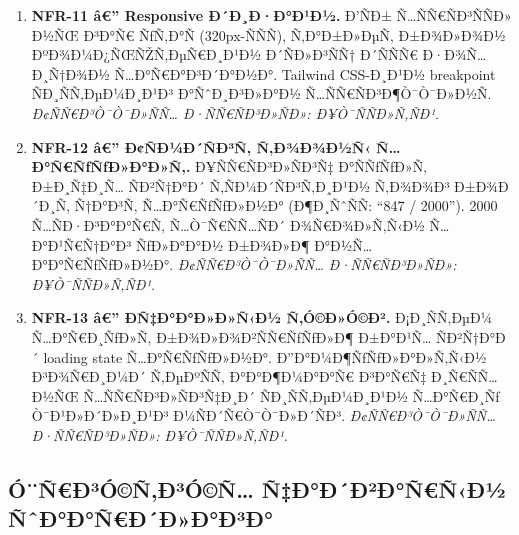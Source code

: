 \documentclass[12pt,A4]{report}
\begin{document}
\begin{enumerate}

  \item \textbf{NFR-11 â€” Responsive Ð´Ð¸Ð·Ð°Ð¹Ð½.}
        Ð’ÑÐ± Ñ…ÑÑ€ÑÐ³ÑÑÐ» Ð½ÑŒ Ð³Ð°Ñ€ ÑƒÑ‚Ð°Ñ (320px-ÑÑÑ), Ñ‚Ð°Ð±Ð»ÐµÑ‚
        Ð±Ð¾Ð»Ð¾Ð½ ÐºÐ¾Ð¼Ð¿ÑŒÑŽÑ‚ÐµÑ€Ð¸Ð¹Ð½ Ð´ÑÐ»Ð³ÑÑ† Ð´ÑÑÑ€ Ð·Ð¾Ñ…Ð¸Ñ†Ð¾Ð½ Ñ…Ð°Ñ€Ð°Ð³Ð´Ð°Ð½Ð°.
        Tailwind CSS-Ð¸Ð¹Ð½ breakpoint ÑÐ¸ÑÑ‚ÐµÐ¼Ð¸Ð¹Ð³ Ð°ÑˆÐ¸Ð³Ð»Ð°Ð½
        Ñ…ÑÑ€ÑÐ³Ð¶Ò¯Ò¯Ð»Ð½Ñ.
        \textit{Ð¢ÑÑ€Ð³Ò¯Ò¯Ð»ÑÑ… Ð·ÑÑ€ÑÐ³Ð»ÑÐ»: Ð¥Ò¯ÑÑÐ»Ñ‚ÑÐ¹.}

  \item \textbf{NFR-12 â€” Ð¢ÑÐ¼Ð´ÑÐ³Ñ‚ Ñ‚Ð¾Ð¾Ð½Ñ‹ Ñ…Ð°Ñ€ÑƒÑƒÐ»Ð°Ð»Ñ‚.}
        Ð¥ÑÑ€ÑÐ³Ð»ÑÐ³Ñ‡ Ð°ÑÑƒÑƒÐ»Ñ‚ Ð±Ð¸Ñ‡Ð¸Ñ… ÑÐ²Ñ†Ð°Ð´ Ñ‚ÑÐ¼Ð´ÑÐ³Ñ‚Ð¸Ð¹Ð½ Ñ‚Ð¾Ð¾Ð³
        Ð±Ð¾Ð´Ð¸Ñ‚ Ñ†Ð°Ð³Ñ‚ Ñ…Ð°Ñ€ÑƒÑƒÐ»Ð½Ð° (Ð¶Ð¸ÑˆÑÑ: ``847 / 2000'').
        2000 Ñ…ÑÐ·Ð³Ð°Ð°Ñ€Ñ‚ Ñ…Ò¯Ñ€ÑÑ…ÑÐ´ Ð¾Ñ€Ð¾Ð»Ñ‚Ñ‹Ð½ Ñ…Ð°Ð¹Ñ€Ñ†Ð°Ð³ ÑƒÐ»Ð°Ð°Ð½
        Ð±Ð¾Ð»Ð¶ Ð°Ð½Ñ…Ð°Ð°Ñ€ÑƒÑƒÐ»Ð½Ð°.
        \textit{Ð¢ÑÑ€Ð³Ò¯Ò¯Ð»ÑÑ… Ð·ÑÑ€ÑÐ³Ð»ÑÐ»: Ð¥Ò¯ÑÑÐ»Ñ‚ÑÐ¹.}

  \item \textbf{NFR-13 â€” ÐÑ‡Ð°Ð°Ð»Ð»Ñ‹Ð½ Ñ‚Ó©Ð»Ó©Ð².}
        Ð¡Ð¸ÑÑ‚ÐµÐ¼ Ñ…Ð°Ñ€Ð¸ÑƒÐ»Ñ‚ Ð±Ð¾Ð»Ð¾Ð²ÑÑ€ÑƒÑƒÐ»Ð¶ Ð±Ð°Ð¹Ñ… ÑÐ²Ñ†Ð°Ð´ loading
        state Ñ…Ð°Ñ€ÑƒÑƒÐ»Ð½Ð°. Ð”Ð°Ð¼Ð¶ÑƒÑƒÐ»Ð°Ð»Ñ‚Ñ‹Ð½ Ð³Ð¾Ñ€Ð¸Ð¼Ð´ Ñ‚ÐµÐºÑÑ‚
        Ð°Ð°Ð¶Ð¼Ð°Ð°Ñ€ Ð³Ð°Ñ€Ñ‡ Ð¸Ñ€ÑÑ… Ð½ÑŒ Ñ…ÑÑ€ÑÐ³Ð»ÑÐ³Ñ‡Ð¸Ð´ ÑÐ¸ÑÑ‚ÐµÐ¼Ð¸Ð¹Ð½
        Ñ…Ð°Ñ€Ð¸Ñƒ Ò¯Ð¹Ð»Ð´Ð»Ð¸Ð¹Ð³ Ð¼ÑÐ´Ñ€Ò¯Ò¯Ð»Ð´ÑÐ³.
        \textit{Ð¢ÑÑ€Ð³Ò¯Ò¯Ð»ÑÑ… Ð·ÑÑ€ÑÐ³Ð»ÑÐ»: Ð¥Ò¯ÑÑÐ»Ñ‚ÑÐ¹.}

\end{enumerate}

\subsection{Ó¨Ñ€Ð³Ó©Ñ‚Ð³Ó©Ñ… Ñ‡Ð°Ð´Ð²Ð°Ñ€Ñ‹Ð½ ÑˆÐ°Ð°Ñ€Ð´Ð»Ð°Ð³Ð°}
\end{document}
